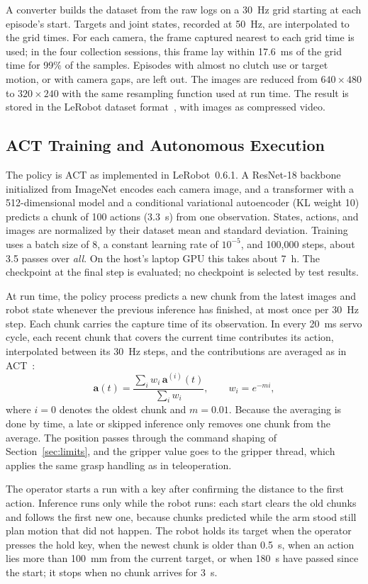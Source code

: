 A converter builds the dataset from the raw logs on a 30~Hz grid starting at
each episode's start. Targets and joint states, recorded at 50~Hz, are
interpolated to the grid times. For each camera, the frame captured nearest to
each grid time is used; in the four collection sessions, this frame lay within
17.6~ms of the grid time for 99\% of the samples. Episodes with almost no clutch
use or target motion, or with camera gaps, are left out. The images are reduced from $640\times480$
to $320\times240$ with the same resampling function used at run time. The
result is stored in the LeRobot dataset format~\cite{cadene2024lerobot}, with
images as compressed video.

\subsection{ACT Training and Autonomous Execution}
\label{sec:execution}
The policy is ACT as implemented in LeRobot~0.6.1. A ResNet-18 backbone
initialized from ImageNet encodes each camera image, and a transformer with
a 512-dimensional model and a conditional variational autoencoder (KL weight
10) predicts a chunk of 100 actions (3.3~s) from one observation. States,
actions, and images are normalized by their dataset mean and standard
deviation. Training uses a batch size of 8, a constant learning rate of
$10^{-5}$, and 100{,}000 steps, about 3.5 passes over \emph{all}. On the host's
laptop GPU this takes about 7~h. The checkpoint at the final step is
evaluated; no checkpoint is selected by test results.

At run time, the policy process predicts a new chunk from the latest images
and robot state whenever the previous inference has finished, at most once
per 30~Hz step. Each chunk carries the capture time of its observation. In
every 20~ms servo cycle, each recent chunk that covers the current time
contributes its action, interpolated between its 30~Hz steps, and the
contributions are averaged as in ACT~\cite{zhao2023act}:
\begin{equation}
\mathbf{a}(t) = \frac{\sum_{i} w_i\,\mathbf{a}^{(i)}(t)}{\sum_{i} w_i},\qquad
w_i = e^{-m i},
\label{eq:ensemble}
\end{equation}
where $i=0$ denotes the oldest chunk and $m=0.01$. Because the averaging is
done by time, a late or skipped inference only removes one chunk from the
average. The position passes through the command shaping of
Section~\ref{sec:limits}, and the gripper value goes to the gripper thread,
which applies the same grasp handling as in teleoperation.

The operator starts a run with a key after confirming the distance to the
first action. Inference runs only while the robot runs: each start clears the
old chunks and follows the first new one, because chunks predicted while the
arm stood still plan motion that did not happen. The robot holds its target when
the operator presses the hold key, when the newest chunk is older than 0.5~s,
when an action lies more than 100~mm from the current target, or when 180~s
have passed since the start; it stops when no chunk arrives for 3~s.
